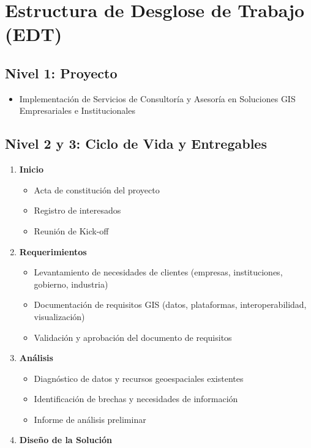 \section{Estructura de Desglose de Trabajo (EDT)}
\begin{multicols}{2}
  \subsection*{Nivel 1: Proyecto}
\begin{itemize}
  \item Implementación de Servicios de Consultoría y Asesoría en Soluciones GIS Empresariales e Institucionales
\end{itemize}

\subsection*{Nivel 2 y 3: Ciclo de Vida y Entregables}
\begin{enumerate}
  \item \textbf{Inicio}
  \begin{itemize}
    \item Acta de constitución del proyecto
    \item Registro de interesados
    \item Reunión de Kick-off
  \end{itemize}
  \item \textbf{Requerimientos}
  \begin{itemize}
    \item Levantamiento de necesidades de clientes (empresas, instituciones, gobierno, industria)
    \item Documentación de requisitos GIS (datos, plataformas, interoperabilidad, visualización)
    \item Validación y aprobación del documento de requisitos
  \end{itemize}
  \item \textbf{Análisis}
  \begin{itemize}
    \item Diagnóstico de datos y recursos geoespaciales existentes
    \item Identificación de brechas y necesidades de información
    \item Informe de análisis preliminar
  \end{itemize}
  \item \textbf{Diseño de la Solución}
  \begin{itemize}

\end{itemize}
\end{enumerate}
\end{multicols}
